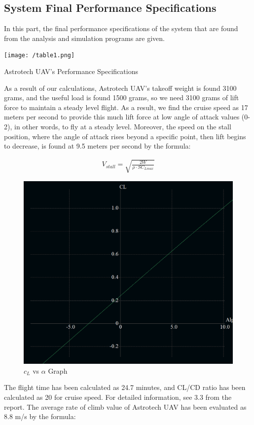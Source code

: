 \documentclass[12pt]{article}
\begin{document}
\subsection{System Final Performance Specifications}
In this part, the final performance specifications of the system that are found from the analysis and simulation programs are given.

\begin{table}[ht]
 	\centering
 	\texttt{[image: /table1.png]}
 	\caption{Astrotech UAV's Performance Specifications}
        \label{fig:stall}
 \end{table}
\FloatBarrier


\justify
As a result of our calculations, Astrotech UAV’s takeoff weight is found 3100 grams, and the useful load is found 1500 grams, so we need 3100 grams of lift force to maintain a steady level flight. As a result, we find the cruise speed as 17 meters per second to provide this much lift force at low angle of attack values (0-2), in other words, to fly at a steady level. Moreover, the speed on the stall position, where the angle of attack rises beyond a specific point, then lift begins to decrease, is found at 9.5 meters per second by the formula:

\begin{align}
	V_{stall} = \sqrt{ \frac{2W}{\rho \cdot S C_{L max}}} 
\end{align}

\begin{figure}[ht]
 	\centering
 	\includegraphics[width = .6\linewidth]{unnamed.png}
 	\caption{$c_L$ vs $\alpha$ Graph}
        \label{fig:stall}
 \end{figure}
\FloatBarrier
\justify
The flight time has been calculated as 24.7 minutes, and CL/CD ratio has been calculated as 20 for cruise speed. For detailed information, see 3.3 from the report.
\justify
The average rate of climb value of Astrotech UAV has been evaluated as 8.8 m/s by the formula:
\end{document}
